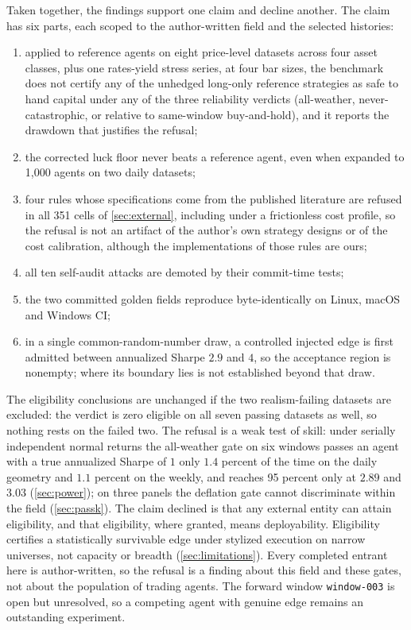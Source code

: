 Taken together, the findings support one claim and decline another. The claim has six parts, each scoped to the author-written field and the selected histories:
\begin{enumerate}[label=(\roman*),leftmargin=*,itemsep=2pt]
\item applied to reference agents on eight price-level datasets across four asset classes, plus one rates-yield stress series, at four bar sizes, the benchmark does not certify any of the unhedged long-only reference strategies as safe to hand capital under any of the three reliability verdicts (all-weather, never-catastrophic, or relative to same-window buy-and-hold), and it reports the drawdown that justifies the refusal;
\item the corrected luck floor never beats a reference agent, even when expanded to 1{,}000 agents on two daily datasets;
\item four rules whose specifications come from the published literature are refused in all 351 cells of \cref{sec:external}, including under a frictionless cost profile, so the refusal is not an artifact of the author's own strategy designs or of the cost calibration, although the implementations of those rules are ours;
\item all ten self-audit attacks are demoted by their commit-time tests;
\item the two committed golden fields reproduce byte-identically on Linux, macOS and Windows CI;
\item in a single common-random-number draw, a controlled injected edge is first admitted between annualized Sharpe $2.9$ and $4$, so the acceptance region is nonempty; where its boundary lies is not established beyond that draw.
\end{enumerate}
The eligibility conclusions are unchanged if the two realism-failing datasets are excluded: the verdict is zero eligible on all seven passing datasets as well, so nothing rests on the failed two. The refusal is a weak test of skill: under serially independent normal returns the all-weather gate on six windows passes an agent with a true annualized Sharpe of $1$ only $1.4$ percent of the time on the daily geometry and $1.1$ percent on the weekly, and reaches 95 percent only at $2.89$ and $3.03$ (\cref{sec:power}); on three panels the deflation gate cannot discriminate within the field (\cref{sec:passk}). The claim declined is that any external entity can attain eligibility, and that eligibility, where granted, means deployability. Eligibility certifies a statistically survivable edge under stylized execution on narrow universes, not capacity or breadth (\cref{sec:limitations}). Every completed entrant here is author-written, so the refusal is a finding about this field and these gates, not about the population of trading agents. The forward window \texttt{window-003} is open but unresolved, so a competing agent with genuine edge remains an outstanding experiment.
